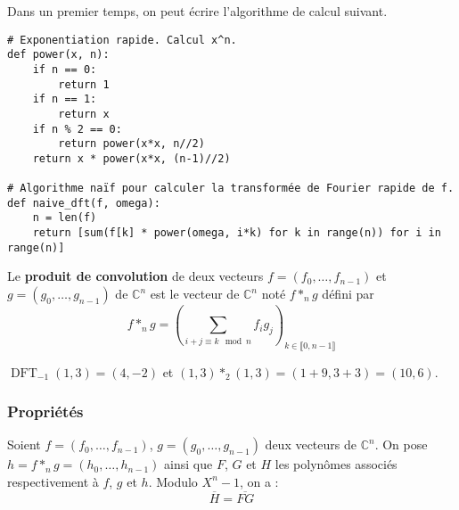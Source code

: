 	Dans un premier temps, on peut écrire l'algorithme de calcul suivant.
	
\begin{lstlisting}
# Exponentiation rapide. Calcul x^n.
def power(x, n):
	if n == 0:
		return 1
	if n == 1:
		return x
	if n % 2 == 0:
		return power(x*x, n//2)
	return x * power(x*x, (n-1)//2)

# Algorithme naïf pour calculer la transformée de Fourier rapide de f.
def naive_dft(f, omega):
	n = len(f)
	return [sum(f[k] * power(omega, i*k) for k in range(n)) for i in range(n)]
\end{lstlisting}
	
	\begin{definition}
		Le \textbf{produit de convolution} de deux vecteurs $f = (f_0, \dots, f_{n-1})$ et $g = (g_0, \dots, g_{n-1})$ de $\mathbb{C}^n$ est le vecteur de $\mathbb{C}^n$ noté $f *_n g$ défini par
		\[ f *_n g = \left( \sum_{i+j \equiv k \mod n} f_ig_j \right)_{k \in \llbracket 0, n-1 \rrbracket} \]
	\end{definition}
	
	\begin{example}
		$\operatorname{DFT}_{-1}(1,3) = (4, -2)$ et $(1,3) *_2 (1,3) = (1 + 9, 3 + 3) = (10, 6)$.
	\end{example}
	
	\subsubsection{Propriétés}
	
	\begin{proposition}
		\label{transformee-de-fourier-discrete-1}
		Soient $f = (f_0, \dots, f_{n-1})$, $g = (g_0, \dots, g_{n-1})$ deux vecteurs de $\mathbb{C}^n$. On pose $h = f *_n g = (h_0, \dots, h_{n-1})$ ainsi que $F$, $G$ et $H$ les polynômes associés respectivement à $f$, $g$ et $h$. Modulo $X^n - 1$, on a :
		\[ \overline{H} = \overline{FG} \]
	\end{proposition}
	
